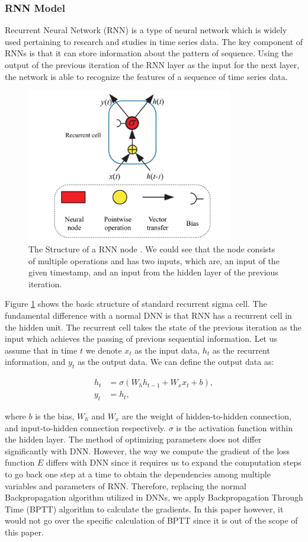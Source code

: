 \subsubsection{RNN Model}
Recurrent Neural Network (RNN) is a type of neural network which is widely used pertaining to research and studies in time series data. The key component of RNNs is that it can store information about the pattern of sequence. Using the output of the previous iteration of the RNN layer as the input for the next layer, the network is able to recognize the features of a sequence of time series data. 
\begin{figure}[ht]
    \centering
    \includegraphics[width=9cm]{images/RNN.png}
    \caption{The Structure of a RNN node \citep{LSTM_GRU_description}. We could see that the node consists of multiple operations and has two inputs, which are, an input of the given timestamp, and an input from the hidden layer of the previous iteration.}
    \label{fig:RNN}
\end{figure}

Figure \ref{fig:RNN} shows the basic structure of standard recurrent sigma cell. The fundamental difference with a normal DNN is that RNN has a recurrent cell in the hidden unit. The recurrent cell takes the state of the previous iteration as the input which achieves the passing of previous sequential information. Let us assume that in time $t$ we denote $x_{t}$ as the input data, $h_{t}$ as the recurrent information, and $y_{t}$ as the output data. We can define the output data as:

\begin{align}
    h_{t} &= \sigma\left(W_{h} h_{t-1}+W_{x} x_{t}+b\right), \\
    y_{t} &= h_{t},
\end{align}

\noindent where $b$ is the bias, $W_{h}$ and $W_{x}$ are the weight of hidden-to-hidden connection, and input-to-hidden connection respectively. $\sigma$ is the activation function within the hidden layer. The method of optimizing parameters does not differ significantly with DNN. However, the way we compute the gradient of the loss function $E$ differs with DNN since it requires us to expand the computation steps to go back one step at a time to obtain the dependencies among multiple variables and parameters of RNN. Therefore, replacing the normal Backpropagation algorithm utilized in DNNs, we apply Backpropagation Through Time (BPTT) algorithm to calculate the gradients. In this paper however, it would not go over the specific calculation of BPTT since it is out of the scope of this paper.


